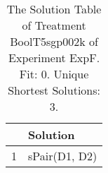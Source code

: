 \begin{table}[ht]
\centering
\begin{tabular}{rp{9cm}}
  \hline
 & Solution \\ 
  \hline
1 & sPair(D1, D2) \\ 
   \hline
\end{tabular}
\caption{The Solution Table of Treatment BoolT5sgp002k of Experiment ExpF. Fit: 0. Unique Shortest Solutions: 3.} 
\end{table}
